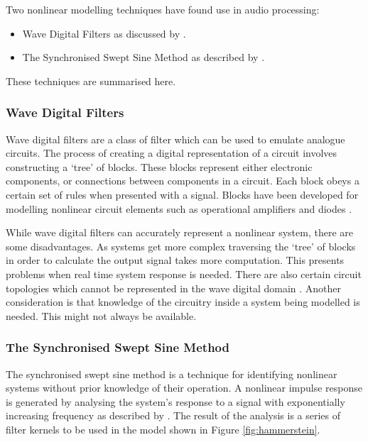 		Two nonlinear modelling techniques have found use in audio processing:

		\begin{itemize}
			\item Wave Digital Filters as discussed by \citet{fettweis1986wave}.
			\item The Synchronised Swept Sine Method as described by \citet{novak2010nonlinear}.
		\end{itemize}

		These techniques are summarised here.

		\subsubsection{Wave Digital Filters}
			Wave digital filters are a class of filter which can be used to emulate analogue circuits. The
			process of creating a digital representation of a circuit involves constructing a `tree' of blocks.
			These blocks represent either electronic components, or connections between components in a
			circuit. Each block obeys a certain set of rules when presented with a signal. Blocks have been
			developed for modelling nonlinear circuit elements such as operational amplifiers and diodes
			\citep{paiva2012emulation}.

			While wave digital filters can accurately represent a nonlinear system, there are some
			disadvantages. As systems get more complex traversing the `tree' of blocks in order to calculate
			the output signal takes more computation. This presents problems when real time system response is
			needed. There are also certain circuit topologies which cannot be represented in the wave digital
			domain \citep{valimaki2011virtual}. Another consideration is that knowledge of the circuitry inside
			a system being modelled is needed. This might not always be available.

		\subsubsection{The Synchronised Swept Sine Method}
			The synchronised swept sine method is a technique for identifying nonlinear systems without prior
			knowledge of their operation. A nonlinear impulse response is generated by analysing the system's
			response to a signal with exponentially increasing frequency as described by
			\citet{novak2010nonlinear}. The result of the analysis is a series of filter kernels to be used in
			the model shown in Figure \ref{fig:hammerstein}.


